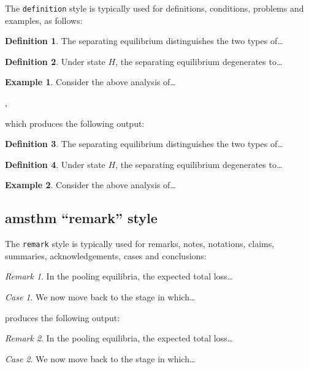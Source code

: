 \documentclass{cje}          %
\theoremstyle{plain}%
\theoremstyle{definition}
\newtheorem{definition}{Definition}
\newtheorem{example}{Example}
\theoremstyle{remark}
\newtheorem*{remark}{Remark}
\newtheorem*{case}{Case}
\begin{document}
The \texttt{definition} style is typically used for definitions, conditions, problems and examples, as follows:
\begin{smallverbatim}
\theoremstyle{definition}
  \newtheorem{definition}{Definition}
  \newtheorem{example}{Example}

\begin{definition}
  The separating equilibrium distinguishes the two types of\ldots
\end{definition}
\begin{definition}
  Under state $H$, the separating equilibrium degenerates to\ldots 
\end{definition}
\begin{example}
  Consider the above analysis of\ldots
\end{example},
\end{smallverbatim}
which produces the following output:
\begin{definition}
  The separating equilibrium distinguishes the two types of\ldots
\end{definition}
\begin{definition}
  Under state $H$, the separating equilibrium degenerates to\ldots
\end{definition}
\begin{example}
  Consider the above analysis of\ldots
\end{example}

\subsection{amsthm ``remark'' style}
The \texttt{remark} style is typically used for remarks, notes, notations, claims, summaries, acknowledgements, cases and conclusions:
\begin{smallverbatim}
\theoremstyle{remark}
  \newtheorem*{remark}{Remark}
  \newtheorem*{case}{Case}

\begin{remark}
  In the pooling equilibria, the expected total loss\ldots
\end{remark}
\begin{case}
  We now move back to the stage in which\ldots
\end{case}
\end{smallverbatim}
produces the following output:
\begin{remark}
  In the pooling equilibria, the expected total loss\ldots
\end{remark}
\begin{case}
  We now move back to the stage in which\ldots
\end{case}
\end{document}
